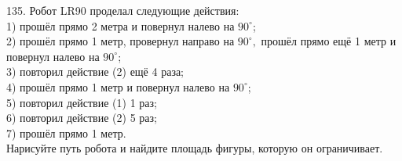 135. Робот LR90 проделал следующие действия:\\
1) прошёл прямо 2 метра и повернул налево на $90^\circ$;\\
2) прошёл прямо 1 метр, провернул направо на $90^\circ,$ прошёл прямо ещё 1 метр и повернул налево на $90^\circ$;\\
3) повторил действие (2) ещё 4 раза;\\
4) прошёл прямо 1 метр и повернул налево на $90^\circ$;\\
5) повторил действие (1) 1 раз;\\
6) повторил действие (2) 5 раз;\\
7) прошёл прямо 1 метр.\\
Нарисуйте путь робота и найдите площадь фигуры, которую он ограничивает.\\
